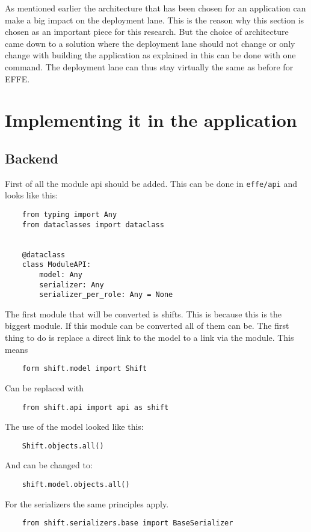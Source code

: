 As mentioned earlier the architecture that has been chosen for an application can make a big impact on the deployment lane. This is the reason why this section is chosen as an important piece for this research. But the choice of architecture came down to a solution where the deployment lane should not change or only change with building the application as explained in  this can be done with one command. The deployment lane can thus stay virtually the same as before for EFFE.

\section{Implementing it in the application}

\subsection{Backend}

First of all the module api should be added. This can be done in \texttt{effe/api} and looks like this:
\begin{verbatim}
    from typing import Any
    from dataclasses import dataclass


    @dataclass
    class ModuleAPI:
        model: Any
        serializer: Any
        serializer_per_role: Any = None
\end{verbatim}

The first module that will be converted is shifts. This is because this is the biggest module. If this module can be converted all of them can be. The first thing to do is replace a direct link to the model to a link via the module. This means
\begin{verbatim}
    form shift.model import Shift
\end{verbatim}

Can be replaced with
\begin{verbatim}
    from shift.api import api as shift
\end{verbatim}

The use of the model looked like this:
\begin{verbatim}
    Shift.objects.all()
\end{verbatim}

And can be changed to:
\begin{verbatim}
    shift.model.objects.all()
\end{verbatim}

For the serializers the same principles apply.
\begin{verbatim}
    from shift.serializers.base import BaseSerializer
\end{verbatim}

